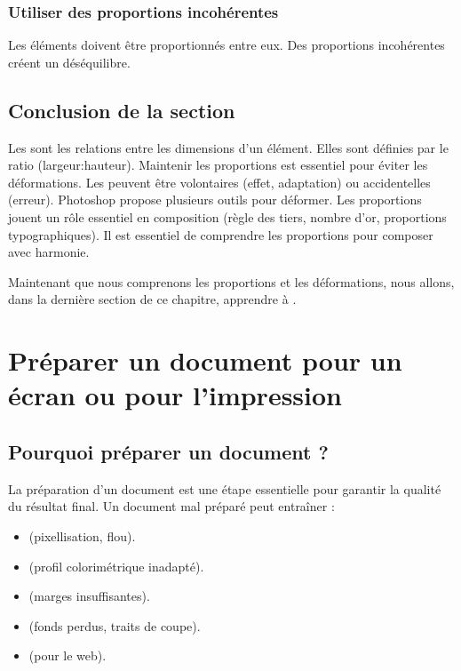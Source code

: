 \subsubsection{Utiliser des proportions incohérentes}

Les éléments doivent être proportionnés entre eux. Des proportions incohérentes créent un déséquilibre.

\subsection*{Conclusion de la section}

Les  sont les relations entre les dimensions d'un élément. Elles sont définies par le ratio (largeur:hauteur). Maintenir les proportions est essentiel pour éviter les déformations. Les  peuvent être volontaires (effet, adaptation) ou accidentelles (erreur). Photoshop propose plusieurs outils pour déformer. Les proportions jouent un rôle essentiel en composition (règle des tiers, nombre d'or, proportions typographiques). Il est essentiel de comprendre les proportions pour composer avec harmonie.

Maintenant que nous comprenons les proportions et les déformations, nous allons, dans la dernière section de ce chapitre, apprendre à .

\section{Préparer un document pour un écran ou pour l'impression}

\subsection{Pourquoi préparer un document ?}

La préparation d'un document est une étape essentielle pour garantir la qualité du résultat final. Un document mal préparé peut entraîner :

\begin{itemize}
    \item {} (pixellisation, flou).
    \item {} (profil colorimétrique inadapté).
    \item {} (marges insuffisantes).
    \item {} (fonds perdus, traits de coupe).
    \item {} (pour le web).
\end{itemize}

